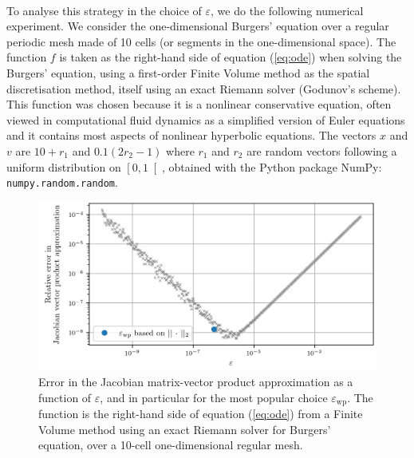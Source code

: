       \paragraph{}
      To analyse this strategy in the choice of $\varepsilon$, we do the following numerical experiment.
      We consider the one-dimensional Burgers' equation over a regular periodic mesh made of 10 cells (or segments in the one-dimensional space).
      The function $f$ is taken as the right-hand side of equation (\ref{eq:ode}) when solving the Burgers' equation, using a first-order Finite Volume method as the spatial discretisation method, itself using an exact Riemann solver (Godunov's scheme).
      This function was chosen because it is a nonlinear conservative equation, often viewed in computational fluid dynamics as a simplified version of Euler equations and it contains most aspects of nonlinear hyperbolic equations.
      The vectors $x$ and $v$ are $10 + r_1$ and $0.1 \left(2 r_2 - 1\right)$ where $r_1$ and $r_2$ are random vectors following a uniform distribution on $\left[0, 1\right[$, obtained with the Python package NumPy: \texttt{numpy.random.random}.

      \begin{figure}
        \centering
        \includegraphics[width=\textwidth]{figures/epsilon_Burgers_10.png}
        \caption{
          Error in the Jacobian matrix-vector product approximation as a function of $\varepsilon$, and in particular for the most popular choice $\varepsilon_\textrm{wp}$.
          The function is the right-hand side of equation (\ref{eq:ode}) from a Finite Volume method using an exact Riemann solver for Burgers' equation, over a 10-cell one-dimensional regular mesh.
        }
        \label{fig:epsilon_burgers_10}
      \end{figure}

